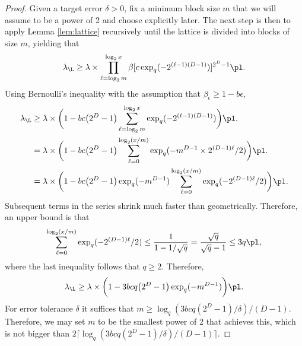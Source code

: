 \begin{proof}
    Given a target error $\delta > 0$, fix a minimum block size $m$ that we will assume to be a power of 2 and choose explicitly later. The next step is then to apply Lemma \ref{lem:lattice} recursively until the lattice is divided into blocks of size $m$, yielding that
    \begin{equation}
        \lambda_{\L} \geq \lambda \times \prod_{\ell = \log_2 m}^{\log_2 x} \beta[c \exp_q(- 2^{(\ell-1)(D-1)})]^{2^D - 1} \pl.
    \end{equation}
    Using Bernoulli's inequality with the assumption that $\beta_\epsilon \geq 1 - b \epsilon$,
    \begin{equation}
    \begin{split}
        \lambda_{\L} & \geq \lambda \times \bigg ( 1 - b c \big ( 2^{D} - 1 \big ) \sum_{\ell = \log_2 m}^{\log_2 x} \exp_q(- 2^{(\ell-1)(D-1)}) \bigg ) \pl.
        \\ & = \lambda \times \bigg ( 1 - b c \big ( 2^{D} - 1 \big )  \sum_{\ell = 0}^{\log_2 (x/m)} \exp_q(-  m^{D-1} \times 2^{(D-1) \ell} / 2) \bigg ) \pl.
        \\ & = \lambda \times \bigg ( 1 - b c \big ( 2^{D} - 1 \big ) \exp_q (- m^{D-1}) \sum_{\ell = 0}^{\log_2 (x/m)} \exp_q(- 2^{(D-1) \ell} / 2) \bigg ) \pl.
    \end{split}
    \end{equation}
    Subsequent terms in the series shrink much faster than geometrically. Therefore, an upper bound is that
    \begin{equation}
        \sum_{\ell = 0}^{\log_2 (x/m)} \exp_q(- 2^{(D-1) \ell} / 2) \leq \frac{1}{1-1/\sqrt{q}} = \frac{\sqrt{q}}{\sqrt{q}-1} \leq 3 q \pl,
    \end{equation}
    where the last inequality follows that $q \geq 2$. Therefore,
    \begin{equation}
        \lambda_{\L} \geq \lambda \times \bigg ( 1 - 3 b c q \big ( 2^{D} - 1 \big ) \exp_q (- m^{D-1}) \bigg ) \pl.
    \end{equation}
    For error tolerance $\delta$ it suffices that $m \geq \log_q (3 b c q ( 2^{D} - 1 ) / \delta) / (D-1)$. Therefore, we may set $m$ to be the smallest power of 2 that achieves this, which is not bigger than $2 \lceil \log_q (3 b c q ( 2^{D} - 1 ) / \delta) / (D-1) \rceil $.
\end{proof}

